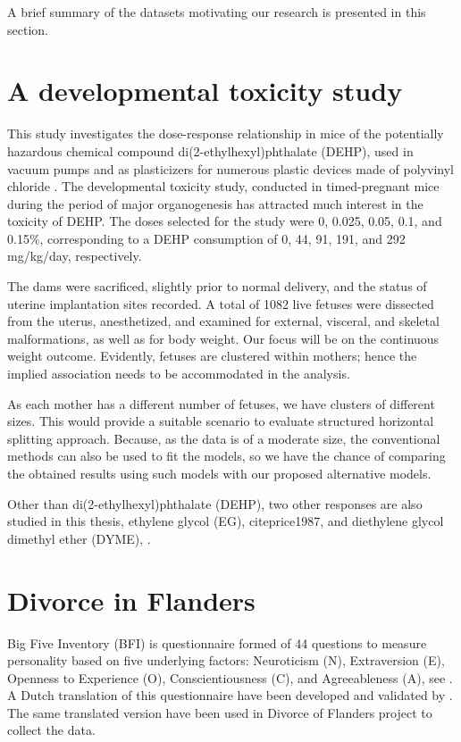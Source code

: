 \documentclass[11pt,a5paper,twoside]{book}
\begin{document}
A brief summary of the datasets motivating our research is presented in this section.
\section{A developmental toxicity study} 

This study investigates the dose-response
relationship in mice of the potentially hazardous chemical compound di(2-ethylhexyl)phthalate
(DEHP), used in vacuum pumps and as plasticizers for numerous plastic devices made of polyvinyl chloride \citep{tyl1988}. The developmental toxicity study, conducted in timed-pregnant
mice during the period of major organogenesis has attracted
much interest in the toxicity of DEHP. The doses selected for the study were 0, 0.025, 0.05, 0.1,
and 0.15\%, corresponding to a DEHP consumption of 0, 44, 91, 191, and 292 mg/kg/day, respectively.

The dams were sacrificed, slightly prior to normal delivery, and the status of uterine implantation sites recorded. A total of 1082 live fetuses were dissected from the uterus, anesthetized, and examined for external, visceral, and skeletal malformations, as well as for body
weight. Our focus will be on the continuous weight outcome. Evidently, fetuses are clustered within mothers; hence the implied association needs to be accommodated in the analysis. 

As each mother has a different number of fetuses, we have clusters of different sizes. This would provide a suitable scenario to evaluate structured horizontal splitting approach. Because, as the data is of a moderate size, the conventional methods can also be used to fit the models, so we have the chance of comparing the obtained results using such models with our proposed alternative models.

Other than di(2-ethylhexyl)phthalate (DEHP), two other responses are also studied in this thesis, ethylene glycol (EG), cite{price1987}, and diethylene glycol dimethyl ether (DYME), \cite{price1985}.

\section{Divorce in Flanders} 

Big Five Inventory (BFI) is questionnaire formed of 44 questions to measure personality based on five underlying factors: Neuroticism (N), Extraversion (E), Openness to Experience (O), Conscientiousness (C), and Agreeableness (A), see \cite{john1999}. A Dutch translation of this questionnaire have been developed and validated by \cite{denissen2008}. The same translated version have been used in Divorce of Flanders project to collect the data.  
\end{document}
